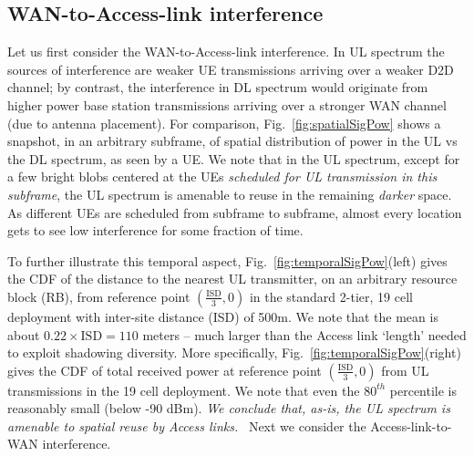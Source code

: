 \documentclass[journal]{IEEEtran}
\begin{document}
\subsection{WAN-to-Access-link interference}
\label{subsec:wan2accIM}
Let us first consider the WAN-to-Access-link interference.  In UL spectrum the sources of interference are weaker UE transmissions arriving over a weaker D2D channel; by contrast, the interference in DL spectrum would originate from higher power base station transmissions arriving over a stronger WAN channel (due to antenna placement).  For comparison, Fig.~\ref{fig:spatialSigPow} shows a snapshot, in an arbitrary subframe, of spatial distribution of power in the UL vs the DL spectrum, as seen by a UE.   We note that in the UL spectrum, except for a few bright blobs centered at the UEs {\em scheduled for UL transmission in this subframe}, the UL spectrum is amenable to reuse in the remaining {\em darker} space.  As different UEs are scheduled from subframe to subframe, almost every location gets to see low interference for some fraction of time.

 \begin{figure*}[!]
\centering
{}
\caption{Snapshot of total signal power (left) in UL spectrum; -90dBm contour curve is plotted in white for reference.  One UE per sector is scheduled and allocated the entire 10MHz bandwidth. (Right) That in  DL spectrum.}
\label{fig:spatialSigPow}
\end{figure*}
\begin{figure*}
\centering
{}
\caption{(Left) CDF of distance to the nearest UL transmitter on a given RB from point $\left(\mbox{ISD}/3,0\right)$. (Right) CDF of total received power in UL spectrum at point $\left(\mbox{ISD}/3,0\right)$; note $80^{th}$\%-tile is reasonably small (below -90 dBm).}
\label{fig:temporalSigPow}
\end{figure*}

To further illustrate this temporal aspect, Fig.~\ref{fig:temporalSigPow}(left) gives the CDF of the distance to the nearest UL transmitter, on an arbitrary resource block (RB), from reference point $\left(\frac{\mbox{ISD}}{3},0\right)$ in the standard 2-tier, 19 cell deployment with inter-site distance (ISD) of 500m.  We note that the mean is about $0.22\times\mbox{ISD}=110$ meters -- much larger than the Access link `length' needed to exploit shadowing diversity.   More specifically, Fig.~\ref{fig:temporalSigPow}(right) gives the CDF of total received power at reference point $\left(\frac{\mbox{ISD}}{3},0\right)$ from UL transmissions in the 19 cell deployment.  We note that even the $80^{th}$ percentile is reasonably small (below -90 dBm). {\em We conclude that, as-is, the UL spectrum is amenable to spatial reuse by Access links.}\footnotemark~ Next we consider the Access-link-to-WAN interference.
\end{document}
